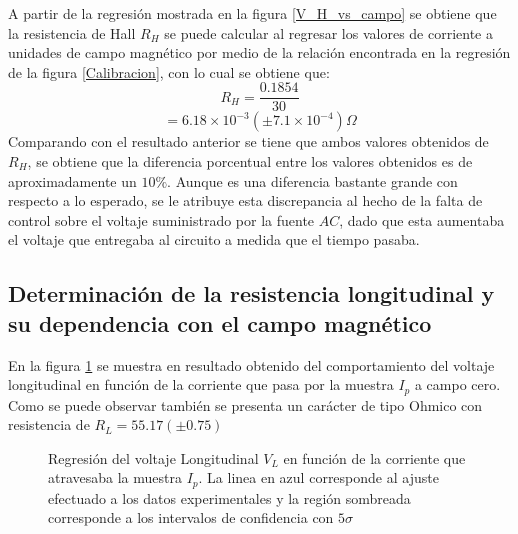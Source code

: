 \documentclass[%
 reprint,
 amsmath,amssymb,
 aps,
]{revtex4-1}
\begin{document}
A partir de la regresión mostrada en la figura \ref{V_H_vs_campo} se obtiene que la resistencia de Hall $R_H$ se puede calcular al regresar los valores de corriente a unidades de campo magnético por medio de la relación encontrada en la regresión de la figura \ref{Calibracion}, con lo cual se obtiene que:
\[R_H=\frac{0.1854}{30}\]
\[=6.18\times 10^{-3} (\pm 7.1\times 10^{-4})\Omega\]
Comparando con el resultado anterior se tiene que ambos valores obtenidos de $R_H$, se obtiene que la diferencia porcentual entre los valores obtenidos es de aproximadamente un $10\%$. Aunque es una diferencia bastante grande con respecto a lo esperado, se le atribuye esta discrepancia al hecho de la falta de control sobre el voltaje suministrado por la fuente $AC$, dado que esta aumentaba el voltaje que entregaba al circuito a medida que el tiempo pasaba. 
\subsection{Determinación de la resistencia longitudinal y su dependencia con el campo magnético}
En la figura \ref{V longitudinal vs ip} se muestra en resultado obtenido del comportamiento del voltaje longitudinal en función de la corriente que pasa por la muestra $I_p$ a campo cero. Como se puede observar también se presenta un carácter de tipo Ohmico con resistencia de $R_L = 55.17 (\pm 0.75)$
\begin{figure}[h!]
\caption{\label{V longitudinal vs ip}Regresión del voltaje Longitudinal $V_L$ en función de la corriente que atravesaba la muestra $I_p$.  La linea en azul corresponde al ajuste efectuado a los datos experimentales y la región sombreada corresponde a los intervalos de confidencia con $5\sigma$}
\end{figure}
\end{document}
